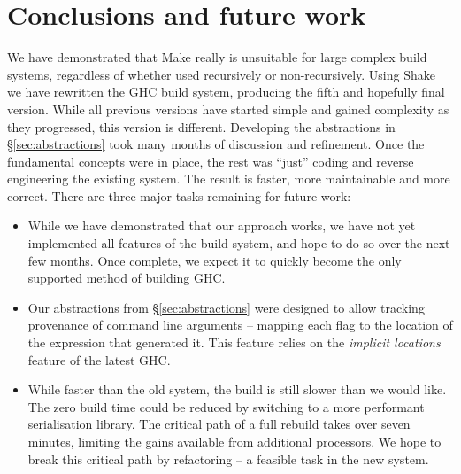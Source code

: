 \section{Conclusions and future work\label{section-conclusions}}

We have demonstrated that Make really is unsuitable for large complex build
systems, regardless of whether used recursively or non-recursively. Using Shake
we have rewritten the GHC build system, producing the fifth and hopefully final
version. While all previous versions have started simple and gained complexity
as they progressed, this version is different. Developing the abstractions in
\S\ref{sec:abstractions} took many months of discussion and refinement. Once the
fundamental concepts were in place, the rest was ``just'' coding and reverse
engineering the existing system. The result is faster, more maintainable and
more correct. There are three major tasks remaining for future work:

\begin{itemize}
\item While we have demonstrated that our approach works, we have not yet
implemented all features of the build system, and hope to do so over the next
few months. Once complete, we expect it to quickly become the only supported
method of building GHC.

\item Our abstractions from \S\ref{sec:abstractions} were designed to allow
tracking provenance of command line arguments -- mapping each flag to the
location of the expression that generated it. This feature relies on the
\emph{implicit locations} feature of the latest GHC.


\item While faster than the old system, the build is still slower than we would
like. The zero build time could be reduced by switching to a more performant serialisation
library. The critical path of a full rebuild takes over seven minutes, limiting
the gains available from additional processors. We hope to break this critical path
by refactoring -- a feasible task in the new system.
\end{itemize}

